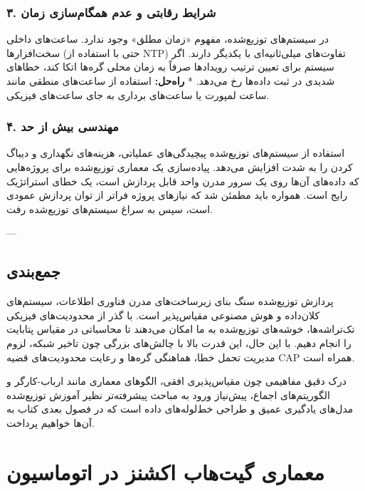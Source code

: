 \documentclass[12pt,a4paper,openany]{book}
\begin{document}
\subsection{۳. شرایط رقابتی  و عدم همگام‌سازی زمان}

در سیستم‌های توزیع‌شده، مفهوم «زمان مطلق» وجود ندارد. ساعت‌های داخلی سخت‌افزارها (حتی با استفاده از NTP) تفاوت‌های میلی‌ثانیه‌ای با یکدیگر دارند. اگر سیستم برای تعیین ترتیب رویدادها صرفاً به زمان محلی گره‌ها اتکا کند، خطاهای شدیدی در ثبت داده‌ها رخ می‌دهد. * \textbf{راه‌حل:} استفاده از ساعت‌های منطقی  مانند ساعت لمپورت  یا ساعت‌های برداری  به جای ساعت‌های فیزیکی.

\subsection{۴. مهندسی بیش از حد }

استفاده از سیستم‌های توزیع‌شده پیچیدگی‌های عملیاتی، هزینه‌های نگهداری و دیباگ کردن را به شدت افزایش می‌دهد. پیاده‌سازی یک معماری توزیع‌شده برای پروژه‌هایی که داده‌های آن‌ها روی یک سرور مدرن واحد قابل پردازش است، یک خطای استراتژیک رایج است. همواره باید مطمئن شد که نیازهای پروژه فراتر از توان پردازش عمودی  است، سپس به سراغ سیستم‌های توزیع‌شده رفت.

---

\section{جمع‌بندی}

پردازش توزیع‌شده سنگ بنای زیرساخت‌های مدرن فناوری اطلاعات، سیستم‌های کلان‌داده و هوش مصنوعی مقیاس‌پذیر است. با گذر از محدودیت‌های فیزیکی تک‌تراشه‌ها، خوشه‌های توزیع‌شده به ما امکان می‌دهند تا محاسباتی در مقیاس پتابایت را انجام دهیم. با این حال، این قدرت بالا با چالش‌های بزرگی چون تاخیر شبکه، لزوم مدیریت تحمل خطا، هماهنگی گره‌ها و رعایت محدودیت‌های قضیه CAP همراه است.

درک دقیق مفاهیمی چون مقیاس‌پذیری افقی، الگوهای معماری مانند ارباب-کارگر و الگوریتم‌های اجماع، پیش‌نیاز ورود به مباحث پیشرفته‌تر نظیر آموزش توزیع‌شده مدل‌های یادگیری عمیق و طراحی خط‌لوله‌های داده  است که در فصول بعدی کتاب به آن‌ها خواهیم پرداخت.


\chapter{معماری گیت‌هاب اکشنز در اتوماسیون}
\end{document}
